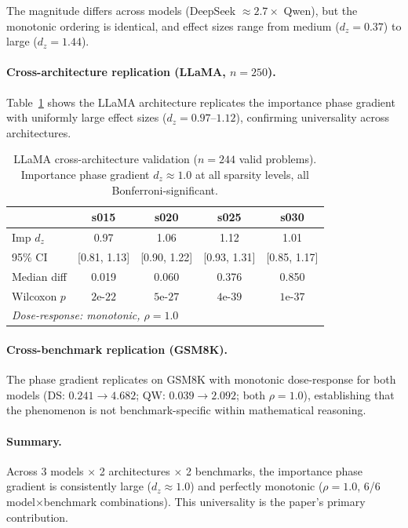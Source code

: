 \documentclass[11pt,a4paper]{article}
\begin{document}
The magnitude differs across models (DeepSeek $\approx 2.7\times$ Qwen), but the monotonic ordering is identical, and effect sizes range from medium ($d_z = 0.37$) to large ($d_z = 1.44$).

\paragraph{Cross-architecture replication (LLaMA, $n = 250$).} Table~\ref{tab:llama} shows the LLaMA architecture replicates the importance phase gradient with uniformly large effect sizes ($d_z = 0.97$--$1.12$), confirming universality across architectures.

\begin{table}[t]
\centering
\small
\begin{tabular}{lcccc}
\toprule
& s015 & s020 & s025 & s030 \\
\midrule
Imp $d_z$ & 0.97 & 1.06 & 1.12 & 1.01 \\
95\% CI & [0.81, 1.13] & [0.90, 1.22] & [0.93, 1.31] & [0.85, 1.17] \\
Median diff & 0.019 & 0.060 & 0.376 & 0.850 \\
Wilcoxon $p$ & $2\text{e-}22$ & $5\text{e-}27$ & $4\text{e-}39$ & $1\text{e-}37$ \\
\midrule
\multicolumn{5}{l}{\textit{Dose-response: monotonic, $\rho = 1.0$}} \\
\bottomrule
\end{tabular}
\caption{LLaMA cross-architecture validation ($n = 244$ valid problems). Importance phase gradient $d_z \approx 1.0$ at all sparsity levels, all Bonferroni-significant.}
\label{tab:llama}
\end{table}

\paragraph{Cross-benchmark replication (GSM8K).} The phase gradient replicates on GSM8K with monotonic dose-response for both models (DS: $0.241 \rightarrow 4.682$; QW: $0.039 \rightarrow 2.092$; both $\rho = 1.0$), establishing that the phenomenon is not benchmark-specific within mathematical reasoning.

\paragraph{Summary.} Across 3 models $\times$ 2 architectures $\times$ 2 benchmarks, the importance phase gradient is consistently large ($d_z \approx 1.0$) and perfectly monotonic ($\rho = 1.0$, 6/6 model$\times$benchmark combinations). This universality is the paper's primary contribution.
\end{document}
